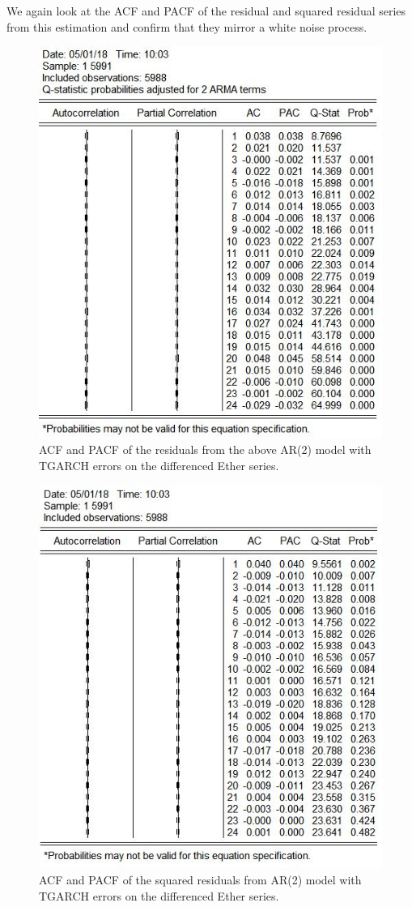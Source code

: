 \documentclass{article}
\begin{document}
	We again look at the ACF and PACF of the residual and squared residual series from this estimation and confirm that they mirror a white noise process. 
	
	\begin{figure}[H]
		\centering
		\includegraphics[width = .75\textwidth]{ethTGARCH_residCor.jpg}
		\caption{ACF and PACF of the residuals from the above AR(2) model with TGARCH errors on the differenced Ether series.}
	\end{figure}
	
	\begin{figure}[H]
		\centering
		\includegraphics[width = .75\textwidth]{ethTGARCH_residSqCor.jpg}
		\caption{ACF and PACF of the squared residuals from AR(2) model with TGARCH errors on the differenced Ether series.}
	\end{figure}
	
\end{document}
